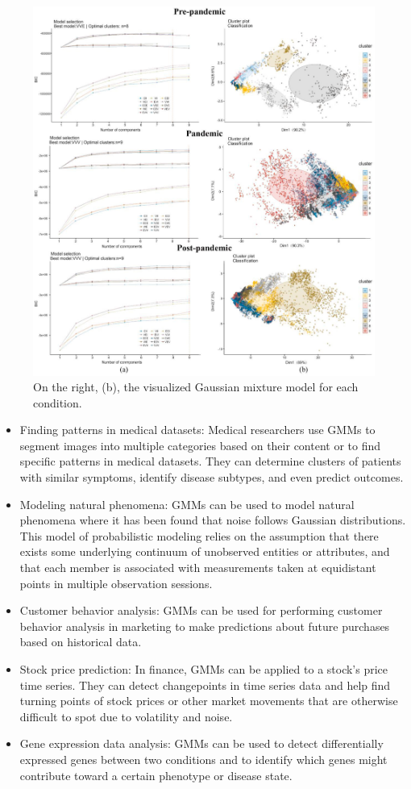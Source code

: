\documentclass[12pt]{article}
\begin{document}
\begin{figure}
\centering
\includegraphics{2.jpg}
\caption{On the right, (b), the visualized Gaussian mixture model for
each condition.}
\end{figure}

\begin{itemize}
\item
  Finding patterns in medical datasets: Medical researchers use GMMs to
  segment images into multiple categories based on their content or to
  find specific patterns in medical datasets. They can determine
  clusters of patients with similar symptoms, identify disease subtypes,
  and even predict outcomes.
\item
  Modeling natural phenomena: GMMs can be used to model natural
  phenomena where it has been found that noise follows Gaussian
  distributions. This model of probabilistic modeling relies on the
  assumption that there exists some underlying continuum of unobserved
  entities or attributes, and that each member is associated with
  measurements taken at equidistant points in multiple observation
  sessions.
\item
  Customer behavior analysis: GMMs can be used for performing customer
  behavior analysis in marketing to make predictions about future
  purchases based on historical data.
\item
  Stock price prediction: In finance, GMMs can be applied to a stock's
  price time series. They can detect changepoints in time series data
  and help find turning points of stock prices or other market movements
  that are otherwise difficult to spot due to volatility and noise.
\item
  Gene expression data analysis: GMMs can be used to detect
  differentially expressed genes between two conditions and to identify
  which genes might contribute toward a certain phenotype or disease
  state.
\end{itemize}
\end{document}
